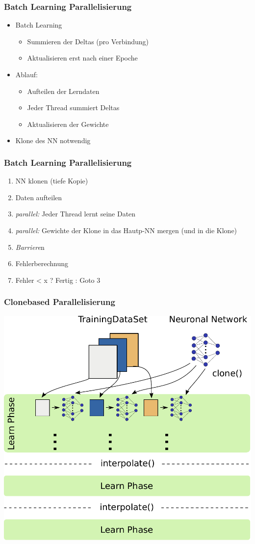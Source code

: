 \documentclass[18pt]{beamer}
\begin{document}
	\begin{frame}[c]\frametitle{Batch Learning Parallelisierung}
		\begin{itemize}
			\item Batch Learning
			\begin{itemize}
				\item Summieren der Deltas (pro Verbindung)
				\item Aktualisieren erst nach einer Epoche
			\end{itemize}
			\item Ablauf:
			\begin{itemize}
				\item Aufteilen der Lerndaten
				\item Jeder Thread summiert Deltas
				\item Aktualisieren der Gewichte
			\end{itemize}
			\item Klone des NN notwendig
		\end{itemize}
	\end{frame}
	
	\begin{frame}\frametitle{Batch Learning Parallelisierung}
		\begin{enumerate}
			\item NN klonen (tiefe Kopie)
			\item Daten aufteilen
			\item \textit{parallel:} Jeder Thread lernt seine Daten
			\item \textit{parallel:} Gewichte der Klone in das Hautp-NN mergen (und in die Klone)
			\item \textit{Barriere}n
			\item Fehlerberechnung
			\item Fehler < x ? Fertig : Goto 3
		\end{enumerate}
	\end{frame}
	
	\begin{frame}\frametitle{Clonebased Parallelisierung}
		\begin{center}
			\includegraphics[width=.65\textwidth]{images/Parallelisierungsansatz.pdf} 
		\end{center}
	\end{frame}
	
\end{document}
